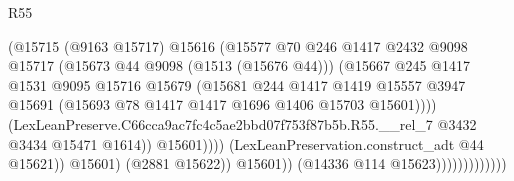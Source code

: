 \begin{lexlean}{R55}
\begin{coremodule}
{{                                              (@15715
                                                (@9163 @15717)
                                                @15616
                                                (@15577
                                                  @70
                                                  @246
                                                  @1417
                                                  @2432
                                                  @9098
                                                  @15717
                                                  (@15673 @44 @9098 (@1513 (@15676 @44)))
                                                  (@15667
                                                    @245
                                                    @1417
                                                    @1531
                                                    @9095
                                                    @15716
                                                    @15679
                                                    (@15681
                                                      @244
                                                      @1417
                                                      @1419
                                                      @15557
                                                      @3947
                                                      @15691
                                                      (@15693
                                                        @78
                                                        @1417
                                                        @1417
                                                        @1696
                                                        @1406
                                                        @15703
                                                        @15601))))
                                                (LexLeanPreserve.C66cca9ac7fc4c5ae2bbd07f753f87b5b.R55.__rel_7
                                                  @3432
                                                  @3434
                                                  @15471
                                                  @1614))
                                              @15601))))
                                      (LexLeanPreservation.construct_adt @44 @15621))
                                    @15601)
                                  (@2881 @15622))
                                @15601))
                            (@14336 @114 @15623)))))))))))))
}}
\end{coremodule}
\end{lexlean}
